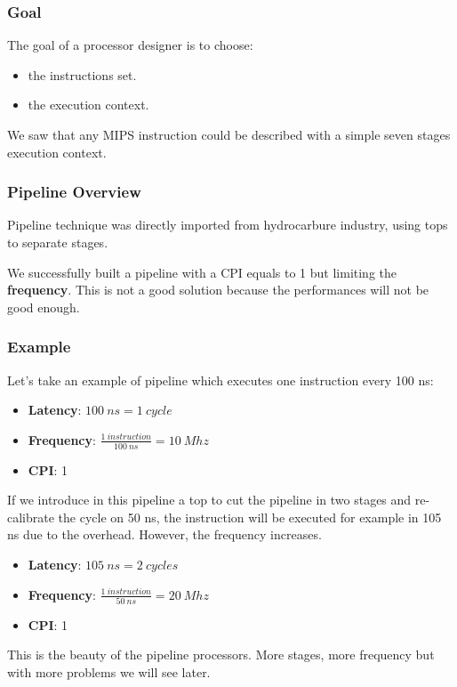 
\begin{frame}
  \frametitle{Goal}

  The goal of a processor designer is to choose:

  \begin{itemize}
    \item
      the instructions set.
    \item
      the execution context.
  \end{itemize}

  \-

  We saw that any MIPS instruction could be described with a simple
  seven stages execution context.
\end{frame}


\begin{frame}
  \frametitle{Pipeline Overview}

  Pipeline technique was directly imported from hydrocarbure industry,
  using tops to separate stages.

  \begin{center}
  \end{center}

  \-

  We successfully built a pipeline with a CPI equals to 1 but
  limiting the \textbf{frequency}. This is not a good solution because the
  performances will not be good enough.
\end{frame}


\begin{frame}
  \frametitle{Example}

  Let's take an example of pipeline which executes one instruction every
  100 ns:

  \begin{itemize}
    \item
      \textbf{Latency}: $100~ns = 1~cycle$
    \item
      \textbf{Frequency}: $\frac{1~instruction}{100~ns} = 10~Mhz$
    \item
      \textbf{CPI}: 1
  \end{itemize}

  If we introduce in this pipeline a top to cut the pipeline in two stages
  and re-calibrate the cycle on 50 ns, the instruction will be executed for
  example in 105 ns due to the overhead. However, the frequency increases.

  \begin{itemize}
    \item
      \textbf{Latency}: $105~ns = 2~cycles$
    \item
      \textbf{Frequency}: $\frac{1~instruction}{50~ns} = 20~Mhz$
    \item
      \textbf{CPI}: 1
  \end{itemize}

  This is the beauty of the pipeline processors. More stages, more frequency
  but with more problems we will see later.
\end{frame}


